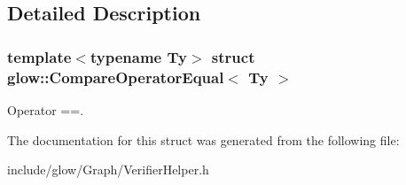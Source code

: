 \subsection{Detailed Description}
\subsubsection*{template$<$typename Ty$>$\newline
struct glow\+::\+Compare\+Operator\+Equal$<$ Ty $>$}

Operator ==. 

The documentation for this struct was generated from the following file\+:\begin{DoxyCompactItemize}
\item 
include/glow/\+Graph/Verifier\+Helper.\+h\end{DoxyCompactItemize}
